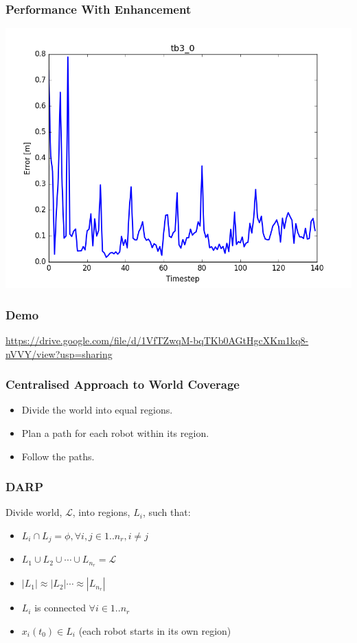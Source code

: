 \documentclass{beamer}
\begin{document}
	\begin{frame}
		\frametitle{Performance With Enhancement}
		\includegraphics[width=\columnwidth]{figure_l1.png}
	\end{frame}
	\begin{frame}
		\frametitle{Demo}
		\url{https://drive.google.com/file/d/1VfTZwqM-bqTKb0AGtHgcXKm1kq8-nVVY/view?usp=sharing}
	\end{frame}
	
	\begin{frame}
		\frametitle{Centralised Approach to World Coverage}
		\pause
		\begin {itemize}
		\item<2-> Divide the world into equal regions.
		\item<3-> Plan a path for each robot within its region.
		\item<4-> Follow the paths.	
		\end {itemize}
	\end{frame}
	\begin{frame}
		\frametitle{DARP}
		Divide world, $\mathcal{L}$, into regions, $L_i$, such that:
		\begin{itemize}
			\item<2-> $L_i \cap L_j = \phi, \forall i, j  \in 1..n_r, i \neq j$
			\item<3-> $L_1 \cup L_2 \cup \cdots \cup L_{n_r} = \mathcal{L}$
			\item<4-> $|L_1| \approx |L_2| \cdots \approx |L_{n_r}|$
			\item<5-> $L_i$ is connected $\forall i\in 1..n_r$
			\item<6-> $x_i(t_0) \in L_i$ (each robot starts in its own region)
		\end{itemize}
	\end{frame}
	
\end{document}
